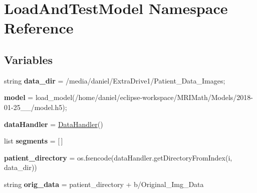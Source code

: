 \hypertarget{namespaceLoadAndTestModel}{}\section{Load\+And\+Test\+Model Namespace Reference}
\label{namespaceLoadAndTestModel}
\subsection*{Variables}
\begin{DoxyCompactItemize}
\item 
\mbox{\label{namespaceLoadAndTestModel_a361241a6702b6faa835ba3b4823f7d35}} 
string {\bfseries data\+\_\+dir} = \textquotesingle{}/media/daniel/Extra\+Drive1/Patient\+\_\+\+Data\+\_\+\+Images\textquotesingle{};
\item 
\mbox{\label{namespaceLoadAndTestModel_a7c95c0ceb71c46e58e3436fc155597fd}} 
{\bfseries model} = load\+\_\+model(\textquotesingle{}/home/daniel/eclipse-\/workspace/M\+R\+I\+Math/Models/2018-\/01-\/25\+\_\+\_/model.\+h5\textquotesingle{});
\item 
\mbox{\label{namespaceLoadAndTestModel_ad819853917b387f9d5a78dad063fdc79}} 
{\bfseries data\+Handler} = \mbox{\hyperlink{classDataHandler_1_1DataHandler}{Data\+Handler}}()
\item 
\mbox{\label{namespaceLoadAndTestModel_a8d9259ecdf95d65b1267a15ebbcee078}} 
list {\bfseries segments} = \mbox{[}$\,$\mbox{]}
\item 
\mbox{\label{namespaceLoadAndTestModel_a0ebe95f90c29b30af71d99b51b4f2440}} 
{\bfseries patient\+\_\+directory} = os.\+fsencode(data\+Handler.\+get\+Directory\+From\+Index(i, data\+\_\+dir))
\item 
\mbox{\label{namespaceLoadAndTestModel_a43a523d3a3deb8b7c6819c3a9e3128d1}} 
string {\bfseries orig\+\_\+data} = patient\+\_\+directory + b\textquotesingle{}/Original\+\_\+\+Img\+\_\+\+Data\textquotesingle{}
\item 
\mbox{\label{namespaceLoadAndTestModel_a5fddddd45be42ad3365a6ef3ffe0426c}} 

\end{DoxyCompactItemize}
